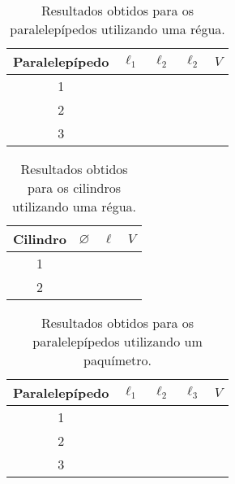 \begin{table*}[!htpb]
	\label{TabelaDadosRegua}
	\begin{center}
	\begin{tabular}{cp{25mm}p{25mm}p{25mm}p{25mm}}
		\toprule
		Paralelepípedo & $\ell_1$ & $\ell_2$ & $\ell_2$ & $V$  \\
		\midrule	
		\cellcolor[gray]{0.89}1 & \cellcolor[gray]{0.92} & \cellcolor[gray]{0.89} & \cellcolor[gray]{0.92} & \cellcolor[gray]{0.89}\\
		\cellcolor[gray]{0.95}2 & \cellcolor[gray]{0.97} & \cellcolor[gray]{0.95} & \cellcolor[gray]{0.97} & \cellcolor[gray]{0.95}\\
		\cellcolor[gray]{0.89}3 & \cellcolor[gray]{0.92} & \cellcolor[gray]{0.89} & \cellcolor[gray]{0.92} & \cellcolor[gray]{0.89}\\
		\bottomrule
	\end{tabular}
	\end{center}
	\caption{Resultados obtidos para os paralelepípedos utilizando uma régua.}
\end{table*}

\begin{table*}[!htpb]
    \begin{center}
	\label{TabelaDadosReguaCil}
	\begin{tabular}{cp{25mm}p{25mm}p{25mm}}
		\toprule
		Cilindro & $\diameter$ & $\ell$ & $V$  \\
		\midrule
		\cellcolor[gray]{0.89} 1 & \cellcolor[gray]{0.92} & \cellcolor[gray]{0.89} & \cellcolor[gray]{0.92} \\
		\cellcolor[gray]{0.95} 2 & \cellcolor[gray]{0.97} & \cellcolor[gray]{0.95} & \cellcolor[gray]{0.97} \\
		\bottomrule
	\end{tabular}
	\end{center}
	\caption{Resultados obtidos para os cilindros utilizando uma régua.}
\end{table*}

\begin{table*}[!htpb]
    \begin{center}
	\label{TabelaDadosPaquimetro}
	\begin{tabular}{cp{25mm}p{25mm}p{25mm}p{25mm}}
		\toprule
		Paralelepípedo & $\ell_1$ & $\ell_2$ & $\ell_3$ & $V$  \\
		\midrule
		\cellcolor[gray]{0.89}1 & \cellcolor[gray]{0.92} & \cellcolor[gray]{0.89} & \cellcolor[gray]{0.92} & \cellcolor[gray]{0.89}\\
		\cellcolor[gray]{0.95}2 & \cellcolor[gray]{0.97} & \cellcolor[gray]{0.95} & \cellcolor[gray]{0.97} & \cellcolor[gray]{0.95}\\
		\cellcolor[gray]{0.89}3 & \cellcolor[gray]{0.92} & \cellcolor[gray]{0.89} & \cellcolor[gray]{0.92} & \cellcolor[gray]{0.89}\\
		\bottomrule
	\end{tabular}
	\end{center}
	\caption{Resultados obtidos para os paralelepípedos utilizando um paquímetro.}
\end{table*}

